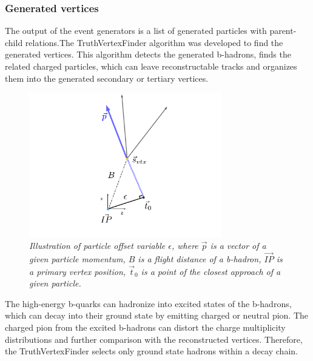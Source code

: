 \subsubsection{Generated vertices}
The output of the event generators is a list of generated particles with parent-child relations.The TruthVertexFinder algorithm was developed to find the generated vertices.%
This algorithm detects the generated b-hadrons, finds the related charged particles, which can leave reconstructable tracks and organizes them into the generated secondary or tertiary vertices.
\begin{figure}
	{\centering
		\includegraphics[width=0.75\textwidth]{ILD/plots/offset-graph.pdf}
		\caption{\sl Illustration of particle offset variable $\epsilon$, where $\vec{p}$ is a vector of a given particle momentum, $B$ is a flight distance of a b-hadron, $\vec{IP}$ is a primary vertex position, $\vec{t}_0$ is a point of the closest approach of a given particle. 
		}
		\label{fig:OffsetPic_3}
	}
\end{figure}





The high-energy b-quarks can hadronize into excited states of the b-hadrons, which can decay into their ground state by emitting charged or neutral pion. 
The charged pion from the excited b-hadrons can distort the charge multiplicity distributions and further comparison with the reconstructed vertices. Therefore, the TruthVertexFinder selects only ground state hadrons within a decay chain. 


